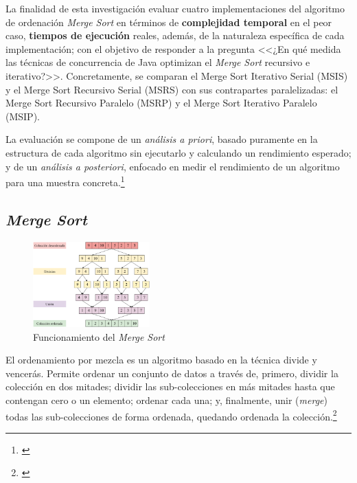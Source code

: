 \documentclass[titlepage]{article}
\begin{document}
La finalidad de esta investigación evaluar cuatro implementaciones del algoritmo de ordenación \textit{Merge Sort} en términos de \textbf{complejidad temporal} en el peor caso, \textbf{tiempos de ejecución} reales, además, de la naturaleza específica de cada implementación; con el objetivo de responder a la pregunta <<¿En qué medida las técnicas de concurrencia de Java optimizan el \textit{Merge Sort} recursivo e iterativo?>>. Concretamente, se comparan el Merge Sort Iterativo Serial (MSIS) y el Merge Sort Recursivo Serial (MSRS) con sus contrapartes paralelizadas: el Merge Sort Recursivo Paralelo (MSRP) y el Merge Sort Iterativo Paralelo (MSIP).

La evaluación se compone de un \textit{análisis a priori}, basado puramente en la estructura de cada algoritmo sin ejecutarlo y calculando un rendimiento esperado; y de un \textit{análisis a posteriori}, enfocado en medir el rendimiento de un algoritmo para una muestra concreta.\footnote{\cite{shoolini2025}}


\subsection{\textit{Merge Sort}} %

\begin{figure}
	\vspace{-10pt}
	\centering
	\includegraphics[width=0.4\textwidth]{Diagrames/arbolMS.png}
	\captionsetup{justification=centering}
	\caption{Funcionamiento del \textit{Merge Sort}}
	\label{fig:arbolMS2}
\end{figure}

El ordenamiento por mezcla es un algoritmo basado en la técnica divide y vencerás. Permite ordenar un conjunto de datos a través de, primero, dividir la colección en dos mitades; dividir las sub-colecciones en más mitades hasta que contengan cero o un elemento; ordenar cada una; y, finalmente, unir (\textit{merge}) todas las sub-colecciones de forma ordenada, quedando ordenada la colección.\footnote{\cite{skiena-2008}}
\end{document}
